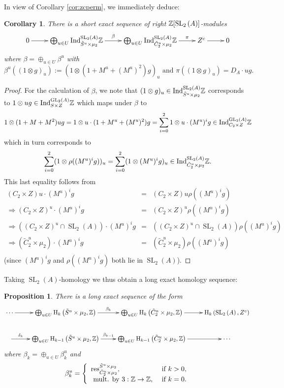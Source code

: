 \documentclass[12pt]{amsart}
\newtheorem{prop}[lem]{Proposition}
\newtheorem{cor}[lem]{Corollary}
\theoremstyle{definition}
\newcommand{\imp}{\Longrightarrow}
\newcommand{\Z}{\Bbb{Z}}
\newcommand{\spl}[2]{\operatorname{SL}_{#1}\left(#2\right)}
\newcommand{\gl}[2]{\mathrm{GL}_{#1}(#2)}
\newcommand{\cconst}[1]{D_{#1}}
\newcommand{\<}{\langle}
\renewcommand{\>}{\rangle}
\newcommand{\ho}[3]{\mathrm{H}_{#1}\left( #2,#3 \right)}
\newcommand{\Ind}[3]{\mathrm{Ind}_{#1}^{#2}#3}
\newcommand{\Res}[2]{\mathrm{res}_{#1}^{#2}}
\begin{document}
In view of Corollary \ref{cor:zcperm}, we immediately deduce:
\begin{cor}\label{cor:U} There is a short exact sequence of right $\Z[\spl{2}{A}]$-modules 
\[
\xymatrix{
0\ar[r]&\bigoplus_{u\in U}\Ind{\tilde{S}^u\times\mu_2}{\spl{2}{A}}\Z\ar^-{\beta}[r]&\bigoplus_{u\in U}\Ind{\tilde{C}_2^u\times\mu_2}{\spl{2}{A}}\Z\ar^-{\pi}[r]&Z^c\ar[r]&0\\
}
\]
where $\beta=\oplus_{u\in U}\beta^u$ with 
\[
\beta^u((1\otimes g)_u):= (1\otimes (1+M^u+(M^u)^2)g)_u \mbox{ and  } \pi((1\otimes g)_u)=\cconst{A}\cdot ug.
\]
\end{cor}

\begin{proof}
For the calculation of $\beta$, we note that $(1\otimes g)_u\in \Ind{\tilde{S}^u\times\mu_2}{\spl{2}{A}}\Z$ corresponds to $1\otimes ug\in \Ind{S\times Z}{\gl{2}{A}}\Z$ 
which maps under $\beta$ to 
\[
1\otimes (1+M+M^2)ug=1\otimes u\cdot (1+M^u+(M^u)^2)g=\sum_{i=0}^2 1\otimes u\cdot (M^u)^ig\in \Ind{C_2\times Z}{\gl{2}{A}}\Z
\]
which in turn corresponds to \[
\sum_{i=0}^2 (1\otimes \rho((M^u)^ig))_u=\sum_{i=0}^2 (1\otimes (M^u)^ig)_u\in \Ind{\tilde{C}_2^u\times\mu_2}{\spl{2}{A}}\Z.
\]
This last equality follows  from 
\begin{eqnarray*}
(C_2\times Z)u\cdot (M^u)^ig&=&(C_2\times Z)u\rho((M^u)^ig)\\
\imp (C_2\times Z)^u\cdot (M^u)^ig&=&(C_2\times Z)^u\rho((M^u)^ig)\\
\imp \left((C_2\times Z)^u\cap \spl{2}{A}\right)\cdot (M^u)^ig&=&\left((C_2\times Z)^u\cap\spl{2}{A}\right)\rho((M^u)^ig)\\
\imp (\tilde{C}_2^u\times\mu_2)\cdot (M^u)^ig&=&(\tilde{C}_2^u\times\mu_2)\rho((M^u)^ig)\\
\end{eqnarray*}
(since $(M^u)^ig$ and $\rho((M^u)^ig)$ both  lie in $\spl{2}{A}$).
\end{proof}

Taking $\spl{2}{A}$-homology we thus obtain a long exact homology sequence:

\begin{prop} \label{prop:leszc}There is a long exact sequence of the form 
\[
\xymatrix{
\cdots\ar[r]&\bigoplus_{u\in U}\ho{k}{\tilde{S}^u\times\mu_2}{\Z}\ar^-{\beta_k}[r]&\bigoplus_{u\in U}\ho{k}{\tilde{C}_2^u\times\mu_2}{\Z}\ar[r]&\ho{k}{\spl{2}{A}}{Z^c}\\
\ar^-{\delta_k}[r]&\bigoplus_{u\in U}\ho{k-1}{\tilde{S}^u\times\mu_2}{\Z}\ar^-{\beta_{k-1}}[r]&\bigoplus_{u\in U}\ho{k-1}{\tilde{C}_2^u\times\mu_2}{\Z}\ar[r]&\cdots
}
\]
where $\beta_k=\oplus_{u\in U}\beta_k^u$ and 
\[
\beta_k^u=
\left\{
\begin{array}{ll}
\Res{\tilde{C}_2^u\times\mu_2}{\tilde{S}^u\times\mu_2},& \mbox{ if }k>0,\\
\mbox{ mult. by } 3:\Z\to \Z,& \mbox{ if }k=0.\\
\end{array}
\right.
\]
\end{prop}
\end{document}

